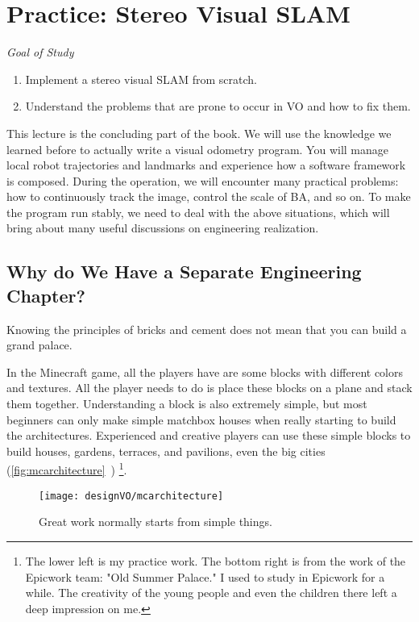 \chapter{Practice: Stereo Visual SLAM}
\begin{mdframed}  
	\textit{Goal of Study}
	\begin{enumerate}[labelindent=0em,leftmargin=1.5em]
	\item Implement a stereo visual SLAM from scratch.
	\item Understand the problems that are prone to occur in VO and how to fix them.
	\end{enumerate}
\end{mdframed}

This lecture is the concluding part of the book. We will use the knowledge we learned before to actually write a visual odometry program. You will manage local robot trajectories and landmarks and experience how a software framework is composed. During the operation, we will encounter many practical problems: how to continuously track the image, control the scale of BA, and so on. To make the program run stably, we need to deal with the above situations, which will bring about many useful discussions on engineering realization.

\newpage
\section{Why do We Have a Separate Engineering Chapter?}
Knowing the principles of bricks and cement does not mean that you can build a grand palace.

In the Minecraft game, all the players have are some blocks with different colors and textures. All the player needs to do is place these blocks on a plane and stack them together. Understanding a block is also extremely simple, but most beginners can only make simple matchbox houses when really starting to build the architectures. Experienced and creative players can use these simple blocks to build houses, gardens, terraces, and pavilions, even the big cities (\autoref{fig:mcarchitecture}~) \footnote{The lower left is my practice work. The bottom right is from the work of the Epicwork team: "Old Summer Palace." I used to study in Epicwork for a while. The creativity of the young people and even the children there left a deep impression on me. }.

\begin{figure}[!htp]
	\centering    
	\texttt{[image: designVO/mcarchitecture]}\\
	\caption{Great work normally starts from simple things.}
	\label{fig:mcarchitecture}
\end{figure}


